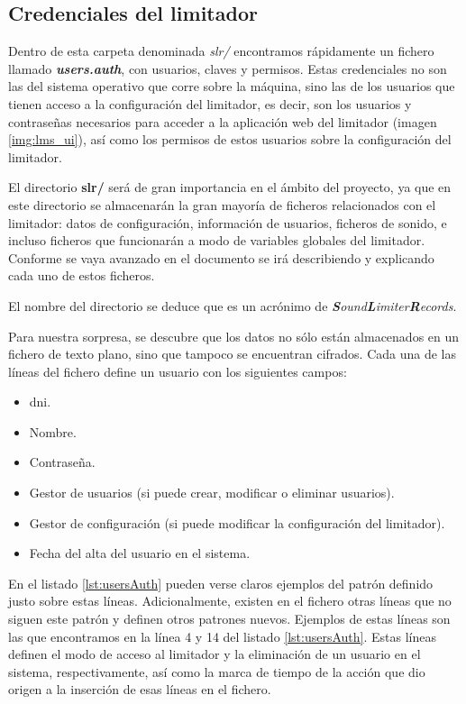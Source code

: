 \subsection{Credenciales del limitador}

Dentro de esta carpeta denominada \textit{slr/} encontramos rápidamente un fichero llamado \textbf{\textit{users.auth}}, con usuarios, claves y permisos. Estas credenciales no son las del sistema operativo que corre sobre la máquina, sino las de los usuarios que tienen acceso a la configuración del limitador, es decir, son los usuarios y contraseñas necesarios para acceder a la aplicación web del limitador (imagen \ref{img:lms_ui}), así como los permisos de estos usuarios sobre la configuración del limitador.

\begin{shaded}
    \noindent
    El directorio \textbf{slr/} será de gran importancia en el ámbito del proyecto, ya que en este directorio se almacenarán la gran mayoría de ficheros relacionados con el limitador: datos de configuración, información de usuarios, ficheros de sonido, e incluso ficheros que funcionarán a modo de variables globales del limitador. Conforme se vaya avanzado en el documento se irá describiendo y explicando cada uno de estos ficheros.
    \par
    \noindent
    El nombre del directorio se deduce que es un acrónimo de \textit{\textbf{S}ound\textbf{L}imiter\textbf{R}ecords}.
\end{shaded}

Para nuestra sorpresa, se descubre que los datos no sólo están almacenados en un fichero de texto plano, sino que tampoco se encuentran cifrados. Cada una de las líneas del fichero define un usuario con los siguientes campos:

\begin{itemize}
    \item \acrshort{dni}.
    \item Nombre.
    \item Contraseña.
    \item Gestor de usuarios (si puede crear, modificar o eliminar usuarios).
    \item Gestor de configuración (si puede modificar la configuración del limitador).
    \item Fecha del alta del usuario en el sistema.
\end{itemize}

En el listado \ref{lst:usersAuth} pueden verse claros ejemplos del patrón definido justo sobre estas líneas. Adicionalmente, existen en el fichero otras líneas que no siguen este patrón y definen otros patrones nuevos. Ejemplos de estas líneas son las que encontramos en la línea 4 y 14 del listado \ref{lst:usersAuth}. Estas líneas definen el modo de acceso al limitador y la eliminación de un usuario en el sistema, respectivamente, así como la marca de tiempo de la acción que dio origen a la inserción de esas líneas en el fichero.

